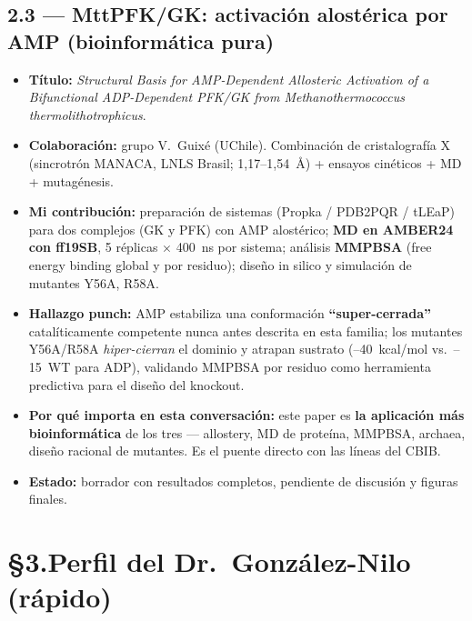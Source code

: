 \documentclass[11pt,a4paper]{article}
\begin{document}
\subsection*{2.3 --- MttPFK/GK: activación alostérica por AMP (bioinformática pura)}
\begin{itemize}
    \item \textbf{Título:} \textit{Structural Basis for AMP-Dependent Allosteric Activation of a Bifunctional ADP-Dependent PFK/GK from Methanothermococcus thermolithotrophicus}.
    \item \textbf{Colaboración:} grupo V.\ Guixé (UChile). Combinación de cristalografía X (sincrotrón MANACA, LNLS Brasil; 1{,}17--1{,}54~\AA) + ensayos cinéticos + MD + mutagénesis.
    \item \textbf{Mi contribución:} preparación de sistemas (Propka / PDB2PQR / tLEaP) para dos complejos (GK y PFK) con AMP alostérico; \textbf{MD en AMBER24 con ff19SB}, 5 réplicas $\times$ 400~ns por sistema; análisis \textbf{MMPBSA} (free energy binding global y por residuo); diseño in silico y simulación de mutantes Y56A, R58A.
    \item \textbf{Hallazgo punch:} AMP estabiliza una conformación \textbf{``super-cerrada''} catalíticamente competente nunca antes descrita en esta familia; los mutantes Y56A/R58A \emph{hiper-cierran} el dominio y atrapan sustrato (--40~kcal/mol vs.\ --15~WT para ADP), validando MMPBSA por residuo como herramienta predictiva para el diseño del knockout.
    \item \textbf{Por qué importa en esta conversación:} este paper es \textbf{la aplicación más bioinformática} de los tres --- allostery, MD de proteína, MMPBSA, archaea, diseño racional de mutantes. Es el puente directo con las líneas del CBIB.
    \item \textbf{Estado:} borrador con resultados completos, pendiente de discusión y figuras finales.
\end{itemize}

\section*{\S3.\quad Perfil del Dr.\ González-Nilo (rápido)}
\end{document}
